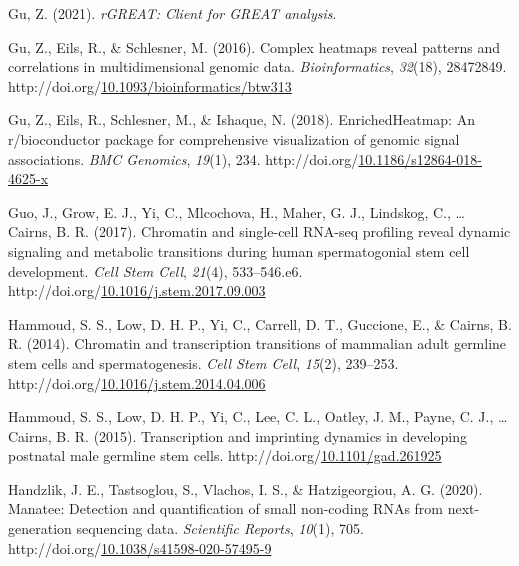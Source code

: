 \documentclass[12pt,twoside]{reedthesis}
\newlength{\cslhangindent}
\newenvironment{CSLReferences}[2] %
 {%
  \setlength{\parindent}{0pt}
  \ifodd #1 \everypar{\setlength{\hangindent}{\cslhangindent}}\ignorespaces\fi
  \ifnum #2 > 0
  \setlength{\parskip}{#2\baselineskip}
  \fi
 }%
 {}
\begin{document}
\begin{CSLReferences}{1}{0}
\leavevmode{}%
Gu, Z. (2021). \emph{rGREAT: Client for GREAT analysis}.

\leavevmode{}%
Gu, Z., Eils, R., \& Schlesner, M. (2016). Complex heatmaps reveal patterns and correlations in multidimensional genomic data. \emph{Bioinformatics}, \emph{32}(18), 28472849. http://doi.org/\href{https://doi.org/10.1093/bioinformatics/btw313}{10.1093/bioinformatics/btw313}

\leavevmode{}%
Gu, Z., Eils, R., Schlesner, M., \& Ishaque, N. (2018). EnrichedHeatmap: An r/bioconductor package for comprehensive visualization of genomic signal associations. \emph{BMC Genomics}, \emph{19}(1), 234. http://doi.org/\href{https://doi.org/10.1186/s12864-018-4625-x}{10.1186/s12864-018-4625-x}

\leavevmode{}%
Guo, J., Grow, E. J., Yi, C., Mlcochova, H., Maher, G. J., Lindskog, C., \ldots{} Cairns, B. R. (2017). Chromatin and single-cell RNA-seq profiling reveal dynamic signaling and metabolic transitions during human spermatogonial stem cell development. \emph{Cell Stem Cell}, \emph{21}(4), 533--546.e6. http://doi.org/\href{https://doi.org/10.1016/j.stem.2017.09.003}{10.1016/j.stem.2017.09.003}

\leavevmode{}%
Hammoud, S. S., Low, D. H. P., Yi, C., Carrell, D. T., Guccione, E., \& Cairns, B. R. (2014). Chromatin and transcription transitions of mammalian adult germline stem cells and spermatogenesis. \emph{Cell Stem Cell}, \emph{15}(2), 239--253. http://doi.org/\href{https://doi.org/10.1016/j.stem.2014.04.006}{10.1016/j.stem.2014.04.006}

\leavevmode{}%
Hammoud, S. S., Low, D. H. P., Yi, C., Lee, C. L., Oatley, J. M., Payne, C. J., \ldots{} Cairns, B. R. (2015). Transcription and imprinting dynamics in developing postnatal male germline stem cells. http://doi.org/\href{https://doi.org/10.1101/gad.261925}{10.1101/gad.261925}

\leavevmode{}%
Handzlik, J. E., Tastsoglou, S., Vlachos, I. S., \& Hatzigeorgiou, A. G. (2020). Manatee: Detection and quantification of small non-coding RNAs from next-generation sequencing data. \emph{Scientific Reports}, \emph{10}(1), 705. http://doi.org/\href{https://doi.org/10.1038/s41598-020-57495-9}{10.1038/s41598-020-57495-9}


\end{CSLReferences}
\end{document}

